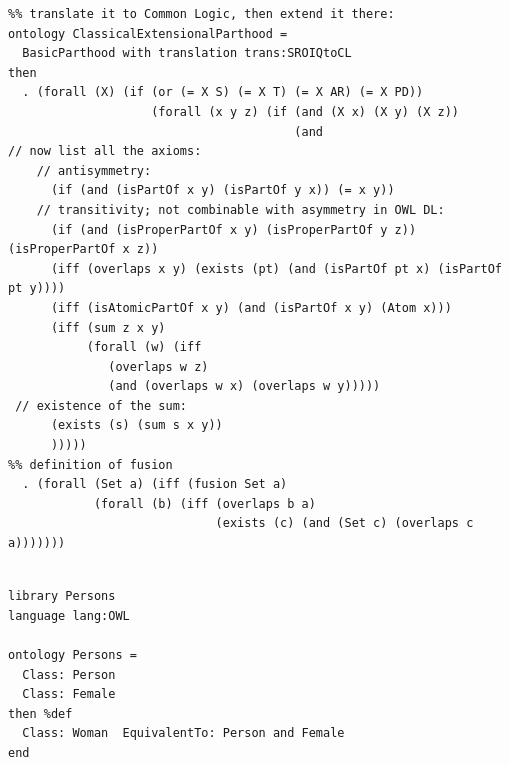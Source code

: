 \documentclass[10pt, a4paper]{isov2}
\begin{document}
\begin{lstlisting}[basicstyle=\ttfamily,language=dolText,alsolanguage=owl2Manchester,alsolanguage=clif,escapechar=@,mathescape]
%% ClassicalExtensionalParthood imports the OWL ontology from above, 
%% translate it to Common Logic, then extend it there:
ontology ClassicalExtensionalParthood =
  BasicParthood with translation trans:SROIQtoCL
then
  . (forall (X) (if (or (= X S) (= X T) (= X AR) (= X PD))
                    (forall (x y z) (if (and (X x) (X y) (X z))
                                        (and                          
// now list all the axioms: 
	// antisymmetry:
      (if (and (isPartOf x y) (isPartOf y x)) (= x y)) 
	// transitivity; not combinable with asymmetry in OWL DL:
      (if (and (isProperPartOf x y) (isProperPartOf y z)) (isProperPartOf x z))
      (iff (overlaps x y) (exists (pt) (and (isPartOf pt x) (isPartOf pt y))))
      (iff (isAtomicPartOf x y) (and (isPartOf x y) (Atom x)))
      (iff (sum z x y)
           (forall (w) (iff 
		   	  (overlaps w z) 
			  (and (overlaps w x) (overlaps w y)))))
 // existence of the sum:
      (exists (s) (sum s x y))                                          
      )))))
%% definition of fusion	  
  . (forall (Set a) (iff (fusion Set a)                                  
            (forall (b) (iff (overlaps b a)
                             (exists (c) (and (Set c) (overlaps c a)))))))
\end{lstlisting}


\label{ex:definedconcepts}
\begin{lstlisting}[basicstyle=\ttfamily,language=dolText,alsolanguage=OWL2manchester,escapechar=@,mathescape]
%prefix( lang:  <http://purl.net/DOL/languages/> )%

library Persons
language lang:OWL

ontology Persons =
  Class: Person
  Class: Female
then %def
  Class: Woman  EquivalentTo: Person and Female
end
\end{lstlisting}

\end{document}
